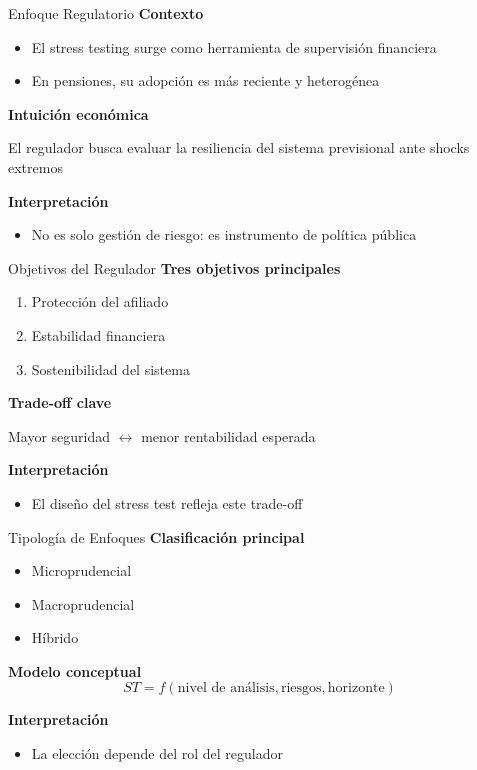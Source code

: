 \documentclass{beamer}
\begin{document}
\begin{frame}{Enfoque Regulatorio}
\textbf{Contexto}
\begin{itemize}
\item El stress testing surge como herramienta de supervisión financiera
\item En pensiones, su adopción es más reciente y heterogénea
\end{itemize}

\textbf{Intuición económica}
\begin{block}{}
El regulador busca evaluar la resiliencia del sistema previsional ante shocks extremos
\end{block}

\textbf{Interpretación}
\begin{itemize}
\item No es solo gestión de riesgo: es instrumento de política pública
\end{itemize}
\end{frame}

\begin{frame}{Objetivos del Regulador}
\textbf{Tres objetivos principales}
\begin{enumerate}
\item Protección del afiliado
\item Estabilidad financiera
\item Sostenibilidad del sistema
\end{enumerate}

\textbf{Trade-off clave}
\begin{block}{}
Mayor seguridad $\leftrightarrow$ menor rentabilidad esperada
\end{block}

\textbf{Interpretación}
\begin{itemize}
\item El diseño del stress test refleja este trade-off
\end{itemize}
\end{frame}

\begin{frame}{Tipología de Enfoques}
\textbf{Clasificación principal}
\begin{itemize}
\item Microprudencial
\item Macroprudencial
\item Híbrido
\end{itemize}

\textbf{Modelo conceptual}
\[
ST = f(\text{nivel de análisis}, \text{riesgos}, \text{horizonte})
\]

\textbf{Interpretación}
\begin{itemize}
\item La elección depende del rol del regulador
\end{itemize}
\end{frame}
\end{document}
